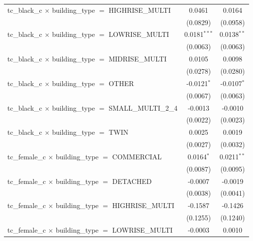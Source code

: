\begin{tabular}{lcc}
   tc\_black\_c $\times$ building\_type $=$ HIGHRISE\_MULTI            & 0.0461         & 0.0164\\   
                                                                       & (0.0829)       & (0.0958)\\   
   tc\_black\_c $\times$ building\_type $=$ LOWRISE\_MULTI             & 0.0181$^{***}$ & 0.0138$^{**}$\\   
                                                                       & (0.0063)       & (0.0063)\\   
   tc\_black\_c $\times$ building\_type $=$ MIDRISE\_MULTI             & 0.0105         & 0.0098\\   
                                                                       & (0.0278)       & (0.0280)\\   
   tc\_black\_c $\times$ building\_type $=$ OTHER                      & -0.0121$^{*}$  & -0.0107$^{*}$\\   
                                                                       & (0.0067)       & (0.0063)\\   
   tc\_black\_c $\times$ building\_type $=$ SMALL\_MULTI\_2\_4         & -0.0013        & -0.0010\\   
                                                                       & (0.0022)       & (0.0023)\\   
   tc\_black\_c $\times$ building\_type $=$ TWIN                       & 0.0025         & 0.0019\\   
                                                                       & (0.0027)       & (0.0032)\\   
   tc\_female\_c $\times$ building\_type $=$ COMMERCIAL                & 0.0164$^{*}$   & 0.0211$^{**}$\\   
                                                                       & (0.0087)       & (0.0095)\\   
   tc\_female\_c $\times$ building\_type $=$ DETACHED                  & -0.0007        & -0.0019\\   
                                                                       & (0.0038)       & (0.0041)\\   
   tc\_female\_c $\times$ building\_type $=$ HIGHRISE\_MULTI           & -0.1587        & -0.1426\\   
                                                                       & (0.1255)       & (0.1240)\\   
   tc\_female\_c $\times$ building\_type $=$ LOWRISE\_MULTI            & -0.0003        & 0.0010\\   

\end{tabular}
